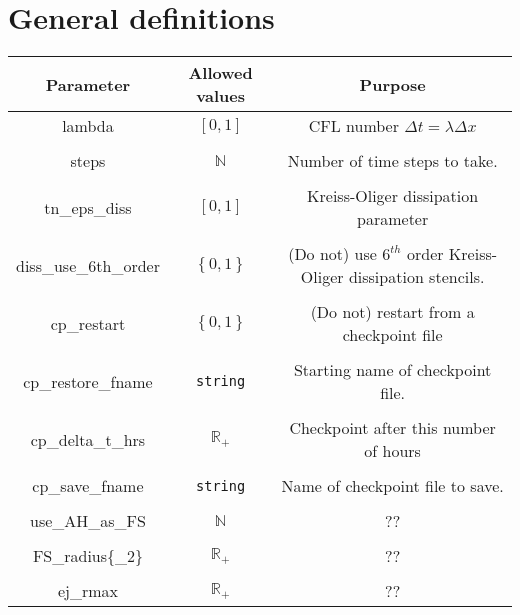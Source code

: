 \documentclass{article}
\begin{document}
\section*{General definitions}
\begin{table}[h]
   \centering 
   \begin{tabular}{ccc}
      Parameter  & Allowed values & Purpose \\
     \midrule\midrule
      lambda
      &
      $\left[0,1\right]$ 
      & 
      CFL number $\Delta t = \lambda \Delta x$
      \\ \\
      steps 
      &
      $\mathbb{N}$
      &
      Number of time steps to take.
      \\ \\
      tn\_eps\_diss 
      &
      $\left[0,1\right]$
      & Kreiss-Oliger dissipation parameter
      \\ \\
      diss\_use\_6th\_order 
      &
      $\left\{0,1\right\}$
      &
      (Do not) use $6^{th}$ order Kreiss-Oliger dissipation stencils.
      \\ \\
      cp\_restart 
      &
      $\left\{0,1\right\}$
      &
      (Do not) restart from a checkpoint file
      \\ \\
      cp\_restore\_fname 
      &
      \texttt{string}
      &
      Starting name of checkpoint file.
      \\ \\
      cp\_delta\_t\_hrs 
      &
      $\mathbb{R}_+$
      &
      Checkpoint after this number of hours
      \\ \\
      cp\_save\_fname 
      &
      \texttt{string}
      &
      Name of checkpoint file to save. 
      \\ \\
      use\_AH\_as\_FS 
      &
      $\mathbb{N}$
      &
      ??
      \\ \\
      FS\_radius\{\_2\}
      &
      $\mathbb{R}_+$
      &
      ??
      \\ \\
      ej\_rmax 
      &
      $\mathbb{R}_+$
      &
      ??
   \end{tabular}
\end{table}

\newpage
\end{document}
